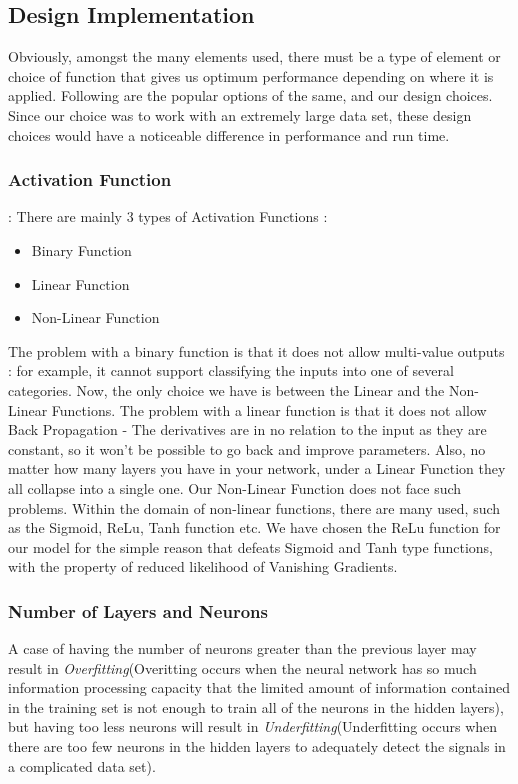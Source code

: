 \documentclass[12pt]{report}
\begin{document}
\subsection{Design Implementation}
Obviously, amongst the many elements used, there must be a type of element or choice of function that gives us optimum performance depending on where it is applied.
Following are the popular options of the same, and our design choices.
Since our choice was to work with an extremely large data set, these design choices would have a noticeable difference in performance and run time.
\subsubsection{Activation Function}:
There are mainly 3 types of Activation Functions :
\begin{itemize}
    \item Binary Function
    \item Linear Function
    \item Non-Linear Function
\end{itemize}
The problem with a binary function is that it does not allow multi-value outputs : for example, it cannot support classifying the inputs into one of several categories.
Now, the only choice we have is between the Linear and the Non-Linear Functions.
The problem with a linear function is that it does not allow Back Propagation - The derivatives are in no relation to the input as they are constant, so it won't be possible to go back and improve parameters.
Also, no matter how many layers you have in your network, under a Linear Function they all collapse into a single one.
Our Non-Linear Function does not face such problems.
Within the domain of non-linear functions, there are many used, such as the Sigmoid, ReLu, Tanh function etc.
We have chosen the ReLu function for our model for the simple reason that defeats Sigmoid and Tanh type functions, with the property of reduced likelihood of Vanishing Gradients.
\subsubsection{Number of Layers and Neurons}
A case of having the number of neurons greater than the previous layer may result in \textit{Overfitting}(Overitting occurs when the neural network has so much information processing capacity that the limited amount of information contained in the training set is not enough to train all of the neurons in the hidden layers), but having too less neurons will result in \textit{Underfitting}(Underfitting occurs when there are too few neurons in the hidden layers to adequately detect the signals in a complicated data set).
\end{document}
